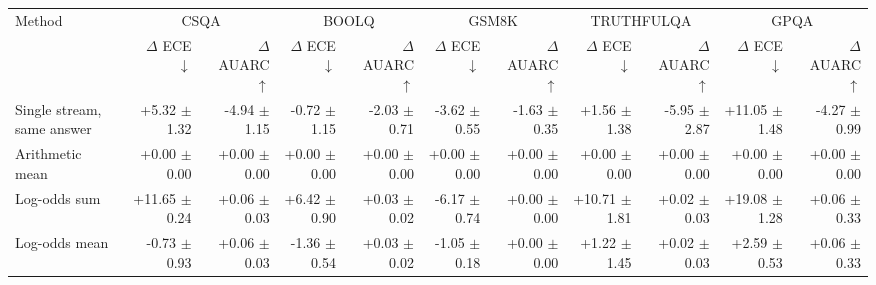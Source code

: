 \begin{tabular}{lrrrrrrrrrr}
\toprule
Method & \multicolumn{2}{c}{CSQA} & \multicolumn{2}{c}{BOOLQ} & \multicolumn{2}{c}{GSM8K} & \multicolumn{2}{c}{TRUTHFULQA} & \multicolumn{2}{c}{GPQA} \\
 & $\Delta$ ECE $\downarrow$ & $\Delta$ AUARC $\uparrow$ & $\Delta$ ECE $\downarrow$ & $\Delta$ AUARC $\uparrow$ & $\Delta$ ECE $\downarrow$ & $\Delta$ AUARC $\uparrow$ & $\Delta$ ECE $\downarrow$ & $\Delta$ AUARC $\uparrow$ & $\Delta$ ECE $\downarrow$ & $\Delta$ AUARC $\uparrow$ \\
\midrule
Single stream, same answer & +5.32 {\scriptsize $\pm$ 1.32} & -4.94 {\scriptsize $\pm$ 1.15} & -0.72 {\scriptsize $\pm$ 1.15} & -2.03 {\scriptsize $\pm$ 0.71} & -3.62 {\scriptsize $\pm$ 0.55} & -1.63 {\scriptsize $\pm$ 0.35} & +1.56 {\scriptsize $\pm$ 1.38} & -5.95 {\scriptsize $\pm$ 2.87} & +11.05 {\scriptsize $\pm$ 1.48} & -4.27 {\scriptsize $\pm$ 0.99} \\
Arithmetic mean & +0.00 {\scriptsize $\pm$ 0.00} & +0.00 {\scriptsize $\pm$ 0.00} & +0.00 {\scriptsize $\pm$ 0.00} & +0.00 {\scriptsize $\pm$ 0.00} & +0.00 {\scriptsize $\pm$ 0.00} & +0.00 {\scriptsize $\pm$ 0.00} & +0.00 {\scriptsize $\pm$ 0.00} & +0.00 {\scriptsize $\pm$ 0.00} & +0.00 {\scriptsize $\pm$ 0.00} & +0.00 {\scriptsize $\pm$ 0.00} \\
Log-odds sum & +11.65 {\scriptsize $\pm$ 0.24} & +0.06 {\scriptsize $\pm$ 0.03} & +6.42 {\scriptsize $\pm$ 0.90} & +0.03 {\scriptsize $\pm$ 0.02} & -6.17 {\scriptsize $\pm$ 0.74} & +0.00 {\scriptsize $\pm$ 0.00} & +10.71 {\scriptsize $\pm$ 1.81} & +0.02 {\scriptsize $\pm$ 0.03} & +19.08 {\scriptsize $\pm$ 1.28} & +0.06 {\scriptsize $\pm$ 0.33} \\
Log-odds mean & -0.73 {\scriptsize $\pm$ 0.93} & +0.06 {\scriptsize $\pm$ 0.03} & -1.36 {\scriptsize $\pm$ 0.54} & +0.03 {\scriptsize $\pm$ 0.02} & -1.05 {\scriptsize $\pm$ 0.18} & +0.00 {\scriptsize $\pm$ 0.00} & +1.22 {\scriptsize $\pm$ 1.45} & +0.02 {\scriptsize $\pm$ 0.03} & +2.59 {\scriptsize $\pm$ 0.53} & +0.06 {\scriptsize $\pm$ 0.33} \\

\end{tabular}
